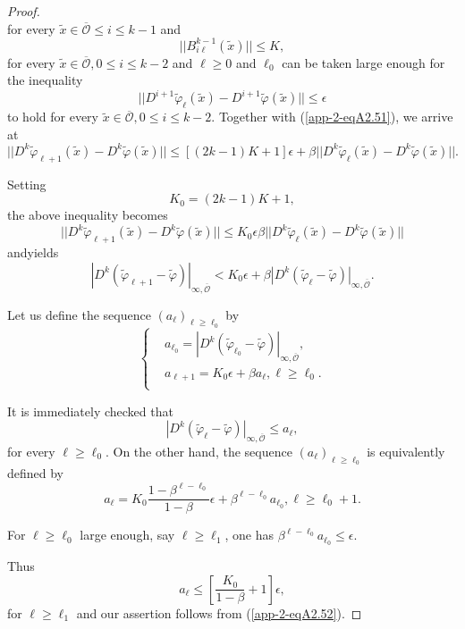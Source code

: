 \begin{proof}
$$$$
for every $\widetilde{x} \in \overline{\mathscr{O}} \leq i \leq
k-1$ and 
$$
||B_{i\ell}^{k-1} (\widetilde{x})|| \leq K,
$$
for every $\widetilde{x} \in \overline{\mathscr{O}}, 0 \leq i
\leq k-2$ and $\ell \geq 0$ and $\ell_{0}$ can be taken large enough
for the inequality
$$
||D^{i+1}\widetilde{\varphi}_{\ell}(\widetilde{x}) -
D^{i+1}\widetilde{\varphi}(\widetilde{x})|| \leq \epsilon
$$
to hold for every $\widetilde{x} \in \overline{\mathscr{O}}, 0
\leq i \leq k-2$. Together with (\ref{app-2-eqA2.51}), we arrive at
$$
||D^{k}\widetilde{\varphi}_{\ell + 1}(\widetilde{x}) -
D^{k}\widetilde{\varphi}(\widetilde{x})|| \leq [(2k-1)K+1] \epsilon +
\beta ||D^{k}\widetilde{\varphi}_{\ell} (\widetilde{x}) -
D^{k}\widetilde{\varphi}(\widetilde{x})||. 
$$

Setting 
$$
K_{0} = (2k-1)K + 1,
$$
the above inequality becomes
$$
||D^{k}\widetilde{\varphi}_{\ell + 1}(\widetilde{x}) -
D^{k}\widetilde{\varphi}(\widetilde{x})|| \leq K_{0} \epsilon
\beta||D^{k}\widetilde{\varphi}_{\ell} (\widetilde{x}) -
D^{k}\widetilde{\varphi}(\widetilde{x})|| 
$$
and\pageoriginale yields
$$
|D^{k} (\widetilde{\varphi}_{\ell + 1} -
\widetilde{\varphi})|_{\infty, \overline{\mathscr{O}}} < K_{0}
\epsilon + \beta |D^{k} (\widetilde{\varphi}_{\ell} -
\widetilde{\varphi})|_{\infty, \overline{\mathscr{O}}}.
$$

Let us define the sequence $(a_{\ell})_{\ell \geq \ell_{0}}$ by
\begin{equation*}
\begin{cases}
& a_{\ell_{0}} = |D^{k}(\widetilde{\varphi}_{\ell_{0}} -
\widetilde{\varphi})|_{\infty, \overline{\mathscr{O}}},\\
& a_{\ell + 1} = K_{0}\epsilon + \beta a_{\ell}, \ell \geq \ell_{0}.\\
\end{cases}
\end{equation*}

It is immediately checked that
\begin{equation*}
|D^{k} (\widetilde{\varphi}_{\ell} - \widetilde{\varphi})|_{\infty,
  \overline{\mathscr{O}}} \leq a_{\ell},\tag{A2.52}\label{app-2-eqA2.52}
\end{equation*}
for every $\ell \geq \ell_{0}$. On the other hand, the sequence
$(a_{\ell})_{\ell \geq \ell_{0}}$ is equivalently defined by
$$
a_{\ell} = K_{0} \frac{1 - \beta^{\ell - \ell_{0}}}{1 - \beta}
\epsilon + \beta^{\ell - \ell_{0}} a_{\ell_{0}}, \ell \geq \ell_{0} + 1.
$$

For $\ell \geq \ell_{0}$ large enough, say $\ell \geq \ell_{1}$, one
has $\beta^{\ell - \ell_{0}} a_{\ell_{0}} \leq \epsilon$.

Thus
$$
a_{\ell} \leq \left[\frac{K_{0}}{1 - \beta} + 1\right] \epsilon,
$$
for $\ell \geq \ell_{1}$ and our assertion follows from (\ref{app-2-eqA2.52}).
\end{proof}

